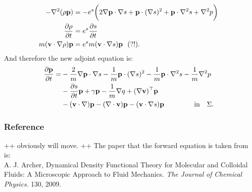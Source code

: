 \begin{align*}
- \nabla^2 (\rho \mathbf{p}) &= - e^s \bigg(2 \nabla \mathbf{p} \cdot \nabla s + \mathbf{p} \cdot (\nabla s)^2 + \mathbf{p} \cdot \nabla^2 s + \nabla^2 p    \bigg)\\
\frac{\partial \rho}{\partial t} &= e^s \frac{\partial s}{\partial t}\\
m (\mathbf{v} \cdot \nabla \rho) \mathbf{p} &= e^s m (\mathbf{v} \cdot \nabla s) \mathbf{p} \ \ (?!).
\end{align*}
And therefore the new adjoint equation is:
\begin{align*}
\frac{\partial \mathbf{p}}{\partial t} =& 
- \frac{2}{m} \nabla \mathbf{p} \cdot \nabla s - \frac{1}{m} \mathbf{p} \cdot (\nabla s)^2 - \frac{1}{m} \mathbf{p} \cdot \nabla^2 s - \frac{1}{m} \nabla^2 p \\
 &- \frac{\partial s}{\partial t} \mathbf{p}   +\gamma  \mathbf{p}-\frac{1}{m} \nabla q + (\nabla \mathbf{v})^\top\mathbf{p} \\
&- (\mathbf{v} \cdot \nabla)\mathbf{p} -  (\nabla \cdot \mathbf{v})\mathbf{p}  -  (\mathbf{v} \cdot \nabla s)\mathbf{p}  \ \qquad\qquad \text{in} \quad \Sigma.
\end{align*}
\subsubsection*{Reference}
++ obviously will move. ++
The paper that the forward equation is taken from is:\\

A. J. Archer, Dynamical Density Functional Theory for Molecular and Colloidal Fluids: A Microscopic Approach to Fluid Mechanics. \textit{The Journal of Chemical Physics}. 130, 2009.
